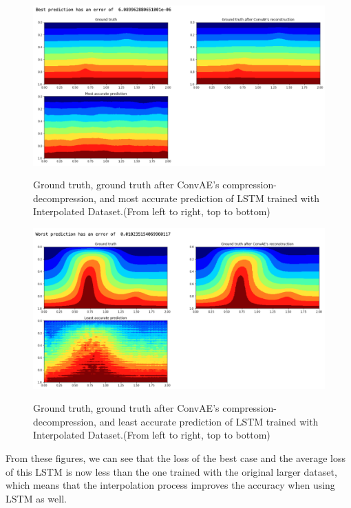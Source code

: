 \begin{figure}[H]
    \caption{Ground truth, ground truth after ConvAE's compression-decompression, and most accurate prediction of LSTM trained with Interpolated Dataset.(From left to right, top to bottom)}
    \includegraphics[scale=0.5]{figures/mantle_convection_images/larger_dataset_interpolated/LSTM_Best.png}
    \label{figure:LSTM_interpolated_best}
\end{figure}

\begin{figure}[H]
    \caption{Ground truth, ground truth after ConvAE's compression-decompression, and least accurate prediction of LSTM trained with Interpolated Dataset.(From left to right, top to bottom)}
    \includegraphics[scale=0.5]{figures/mantle_convection_images/larger_dataset_interpolated/LSTM_Worst.png}
    \label{figure:LSTM_interpolated_worst}
\end{figure}

From these figures, we can see that the loss of the best case and the average loss of this LSTM is now less than the one trained with the original larger dataset, which means that the interpolation process improves the accuracy when using LSTM as well.

